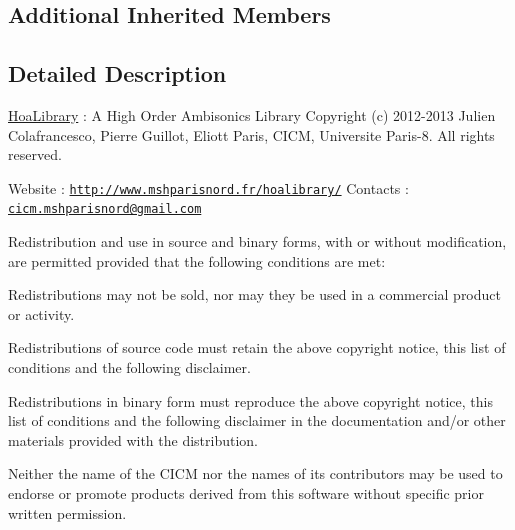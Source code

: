 \subsection*{Additional Inherited Members}


\subsection{Detailed Description}
\hyperlink{interface_hoa_library}{Hoa\-Library} \-: A High Order Ambisonics Library Copyright (c) 2012-\/2013 Julien Colafrancesco, Pierre Guillot, Eliott Paris, C\-I\-C\-M, Universite Paris-\/8. All rights reserved.

Website \-: \href{http://www.mshparisnord.fr/hoalibrary/}{\tt http\-://www.\-mshparisnord.\-fr/hoalibrary/} Contacts \-: \href{mailto:cicm.mshparisnord@gmail.com}{\tt cicm.\-mshparisnord@gmail.\-com}

Redistribution and use in source and binary forms, with or without modification, are permitted provided that the following conditions are met\-:


\begin{DoxyItemize}
\item Redistributions may not be sold, nor may they be used in a commercial product or activity.
\item Redistributions of source code must retain the above copyright notice, this list of conditions and the following disclaimer.
\item Redistributions in binary form must reproduce the above copyright notice, this list of conditions and the following disclaimer in the documentation and/or other materials provided with the distribution.
\item Neither the name of the C\-I\-C\-M nor the names of its contributors may be used to endorse or promote products derived from this software without specific prior written permission.
\end{DoxyItemize}

